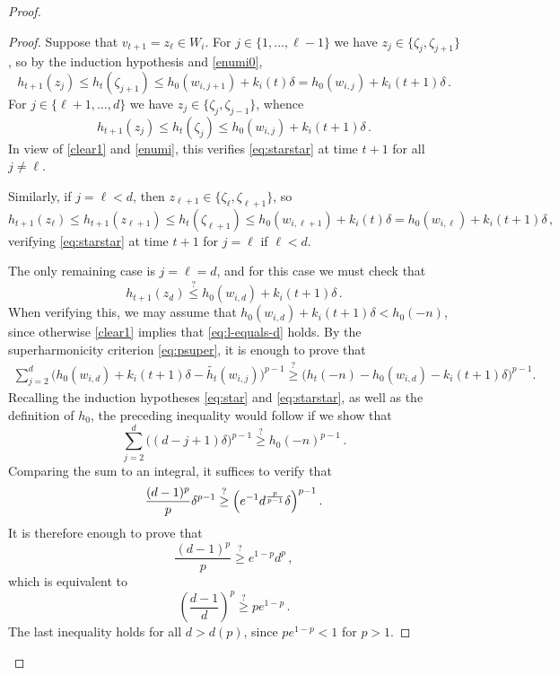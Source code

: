 \documentclass[10pt,a4paper]{amsart}
\begin{document}
\begin{proof}
\begin{proof}
    Suppose that $v_{t+1}=z_\ell \in W_i$. For   $j\in  \{1,\ldots,\ell-1\}$
    we have 
    $z_j \in \{\zeta_j,  \zeta_{j+1}\}$,  so 
    by the induction hypothesis and \eqref{enumi0},
    $$h_{t+1}(z_j)  \le h_t(\zeta_{j+1})\le h_0(w_{i,j+1})+k_i(t)\delta=h_0(w_{i,j})+k_i(t+1)\delta \,.$$
    For   $j\in  \{\ell+1,\ldots,d\} $
    we have $z_j\in \{\zeta_j,  \zeta_{j-1}\}$,
    whence 
    $$h_{t+1}(z_j)  \le h_t( \zeta_j)\le h_0(w_{i,j})+k_i(t+1)\delta\,.$$
     In view of \eqref{clear1} and \eqref{enumi}, this verifies   \eqref{eq:starstar}  at time $t+1$ for all $j \ne \ell$. 
    
    Similarly, if $j=\ell<d$, then
    $z_{\ell+1}\in \{\zeta_\ell,  \zeta_{\ell+1}\}$, so
    $$h_{t+1}(z_\ell) \le h_{t+1}(z_{\ell+1}) \le h_{t}(\zeta_{\ell+1}) \le h_0(w_{i,\ell+1})+k_i(t)\delta = h_0(w_{i,\ell})+k_i(t+1)\delta \,,$$ 
    verifying \eqref{eq:starstar}  at time $t+1$ for   $j = \ell$ if $\ell<d$.

The only remaining case is $j=\ell=d$, and for this case we must check that
\begin{equation} \label{eq:l-equals-d} h_{t+1}(z_d) \stackrel{?}{\leq} h_0(w_{i,d})+k_i(t+1)\delta \,.
\end{equation}
When verifying this, we may assume that $h_0(w_{i,d})+k_i(t+1)\delta < h_0(-n)$, since otherwise   \eqref{clear1} implies that \eqref{eq:l-equals-d} holds. 
    By the superharmonicity criterion \eqref{eq:psuper}, it is enough to prove that
    \begin{eqnarray*}  
\sum_{j=2}^{d}\bigl(h_0(w_{i,d})+k_i(t+1)\delta -\widetilde{h_t}(w_{i,j})\bigr)^{p-1} 
  \stackrel{?}{\geq} \bigl(h_t(-n)-h_0(w_{i,d})-k_i(t+1)\delta \bigr)^{p-1} .
    \end{eqnarray*}
Recalling the induction hypotheses
\eqref{eq:star} and \eqref{eq:starstar}, as well as   the definition of $h_0$, the preceding inequality   would follow  if we show that
\begin{equation}
    \sum_{j=2}^{d}\bigl((d-j+1)\delta \bigr)^{p-1} \stackrel{?}{\geq}  h_0(-n)^{p-1}\, .
\end{equation}
    Comparing the sum to an integral, it suffices to verify that
    \begin{equation}
        \frac{(d-1)^p}{p}\delta^{p-1}\stackrel{?}{\geq} \Bigl(e^{-1}d^\frac{p}{p-1}\delta \Bigr)^{p-1} \, .
    \end{equation}
    It is therefore enough to prove that
    \begin{equation}
        \frac{(d-1)^p}{p}\stackrel{?}{\geq}  {e^{1-p}}d^p \, ,
    \end{equation}
    which is equivalent to 
    \begin{equation}
        \left(\frac{d-1}{d}\right)^p\stackrel{?}{\geq}pe^{1-p} \, .
    \end{equation}
    The last inequality holds for all $d>d(p)$, since   $pe^{1-p}<1$ for $p>1$.


\end{proof}
\end{proof}
\end{document}

